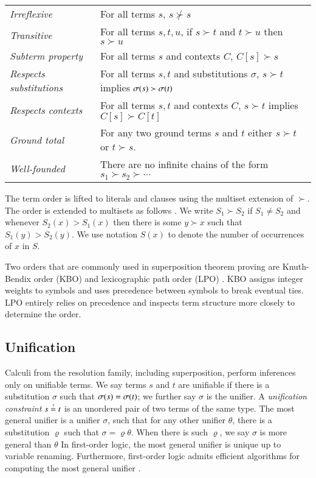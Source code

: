 \noindent\begin{tabular}{p{}p{}}
    \textit{Irreflexive} & For all terms $s$, $s \not\succ s$ \\
    \textit{Transitive} & For all terms $s, t, u$,  if $s\succ t$ and $t \succ u$ then $s \succ u$ \\ 
    \textit{Subterm property} & For all terms $s$ and contexts $C$, $C[s] \succ s$ \\
    \textit{Respects substitutions} & For all terms $s, t$ and substitutions $\sigma$, $s \succ t$ implies $\sigma(s) \succ \sigma(t)$ \\
    \textit{Respects contexts} & For all terms $s,t$ and contexts $C$, $s \succ t$ implies $C[s] \succ C[t]$ \\
    \textit{Ground total} & For any two
    ground terms $s$ and $t$ either $s \succ t$ or $t \succ s$. \\
    \textit{Well-founded} & There are no infinite chains of the form $s_1 \succ s_2 \succ \cdots$ 
\end{tabular}

The term order is lifted to literals and clauses using the multiset extension of
$\succ$. The order is extended to multisets as follows
\cite[Sect.~2.5]{bg-01-resolution}. We write $S_1 \succ S_2$ if $S_1 \not= S_2$
and whenever $S_2(x) > S_1(x)$ then there is some $y \succ x$ such that $S_1(y)
> S_2(y)$. We use notation $S(x)$ to denote the number of occurrences of $x$ in
$S$. 

Two orders that are commonly used in superposition theorem proving are
Knuth-Bendix order (KBO) \cite[Sect.~5.4.4]{bn-98-tr-and-all-that} and
lexicographic path order (LPO) \cite[Sect.~5.4.2]{bn-98-tr-and-all-that}.
KBO assigns integer weights to symbols and uses precedence between symbols to
break eventual ties. LPO entirely relies on precedence and inspects term
structure more closely to determine the order. 


\subsection{Unification}

Calculi from the resolution family, including superposition, perform inferences
only on unifiable terms. We say terms $s$ and $t$ are unifiable if there is a
substitution $\sigma$ such that $\sigma(s) = \sigma(t)$; we further say
$\sigma$ is the unifier. A \emph{unification constraint} $s \unif t$ is an unordered pair of two terms of
the same type. The most general unifier is a unifier $\sigma$, such that for any
other unifier $\theta$, there is a substitution $\varrho$ such that $\sigma =
\varrho\theta$. When there is such $\varrho$, we say $\sigma$ is more general
than $\theta$ In first-order logic, the most general unifier is unique up to
variable renaming. Furthermore, first-order logic admits efficient algorithms
for computing the most general unifier \cite{hv-09-unifalgs}.

